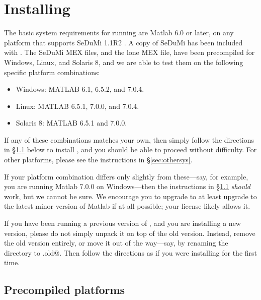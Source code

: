 \documentclass[12pt]{article}
\begin{document}
\newpage
\appendix

\section{Installing \cvx}
\label{s-installing}

The basic system requirements for running \cvx are Matlab 6.0 or later,
on any platform that supports SeDuMi 1.1R2 \cite{SeDuMi}. A copy of SeDuMi
has been included with \cvx.
The SeDuMi MEX files, and the lone \cvx MEX file, have been precompiled
for Windows, Linux, and Solaris 8, and we are able
to test them on the following specific platform combinations:
\begin{itemize}
\item Windows: MATLAB 6.1, 6.5.2, and 7.0.4.
\item Linux: MATLAB 6.5.1, 7.0.0, and 7.0.4.
\item Solaris 8: MATLAB 6.5.1 and 7.0.0.
\end{itemize}
If any of these combinations matches your own, then simply follow the directions in
\S\ref{sec:winlin} below to install \cvx, and you should be able to
proceed without difficulty.
For other platforms, please see the instructions in \S\ref{sec:othersys}.

If your platform combination differs only slightly from these---say,
for example, you are running Matlab 7.0.0 
on Windows---then the instructions in \S\ref{sec:winlin} \emph{should}
work, but we cannot be sure. We encourage
you to upgrade to at least upgrade to the latest minor version of
Matlab if at all possible; your license likely allows it.

If you have been running a previous version of \cvx, and you are installing
a new version, please do not simply unpack it on top of the old version. Instead,
remove the old version entirely, or move it out of the way---say, by renaming
the directory \verb@cvx@ to \verb@cvx.old@. Then follow the
directions as if you were installing \cvx for the first time.

\subsection{Precompiled platforms}
\label{sec:winlin}
\end{document}
